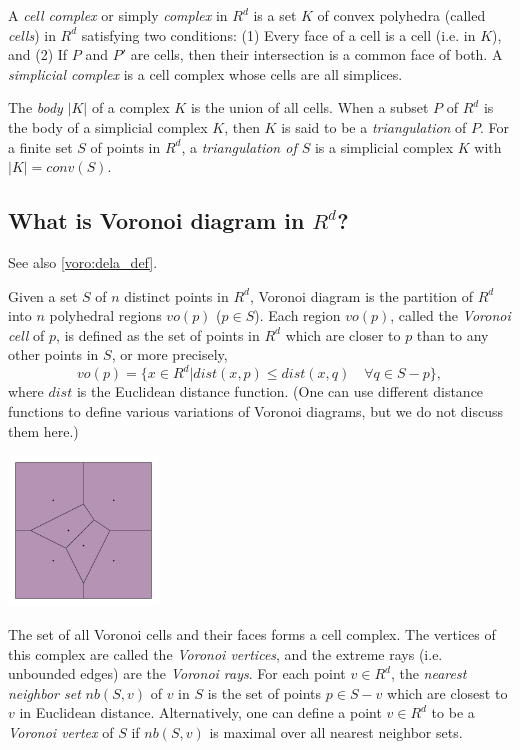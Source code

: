 \documentclass[[a4paper,12pt]{article}
\begin{document}
A {\em cell complex\/} or simply {\em complex} in 
$R^d$ is a set $K$ of convex polyhedra (called 
{\em cells\/}) in $R^d$ satisfying two conditions: 
(1) Every face of a cell is a cell (i.e. in $K$), and (2) If $P$ and $P'$ are
cells, then their intersection is a common face of both.  
A {\em simplicial complex\/} is a cell complex whose cells are all 
simplices.

The {\em body\/} $|K|$ of a complex $K$ is the union of all cells.
When a subset $P$ of $R^d$ is the body of a simplicial complex $K$,
then $K$ is said to be a {\em triangulation\/} of $P$.
For a finite set $S$ of points in $R^d$, a {\em triangulation of $S$}
is a simplicial complex $K$ with $|K|=conv(S)$.

\subsection{What is Voronoi diagram in $R^d$?} \label{voro:def}

See also \ref{voro:dela_def}.

Given a set $S$ of $n$ distinct points in $R^d$,
Voronoi diagram is the partition of $R^d$ into $n$ polyhedral regions 
$vo(p)$ ($p \in S$).  Each region $vo(p)$,
called the {\em Voronoi cell\/} of $p$,
is defined as the set of points in $R^d$ which are
closer to $p$ than to any other points in $S$, or more precisely,
\[
vo(p) = \{ x \in R^d | dist(x, p) \leq dist(x, q) \quad \forall q\in S - p \},
\]
where $dist$ is the Euclidean distance function.  (One can
use different distance functions to define various
variations of Voronoi diagrams, but we do not
discuss them here.)

\bigskip
\begin{center}
\includegraphics[height=40mm]{vtest_fig_vo}
\end{center}

The set of all Voronoi cells and their faces forms a cell complex.
The vertices of this complex are called the {\em Voronoi vertices\/},
and the extreme rays (i.e. unbounded edges) are  the {\em Voronoi rays\/}.
For each point $v\in R^d$,  the {\em nearest neighbor set\/} 
$nb(S, v)$ of $v$ in $S$ is the set of points $p \in S-v$ which
are closest to $v$ in Euclidean distance.
Alternatively, one can define a point $v \in R^d$ 
to be a {\em Voronoi vertex\/} of $S$ if $nb(S, v)$
is maximal over all nearest neighbor sets.
\end{document}
